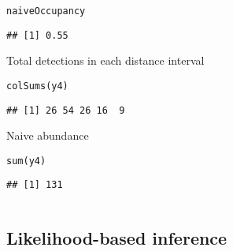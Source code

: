 \documentclass[color=usenames,dvipsnames]{beamer}\usepackage[]{graphicx}\usepackage[]{color}
\makeatletter
\newcommand{\hlstd}[1]{\textcolor[rgb]{0,0,0}{#1}}%
\newcommand{\hlkwd}[1]{\textcolor[rgb]{0.004,0.004,0.506}{#1}}%
\newenvironment{kframe}{%
 \def\at@end@of@kframe{}%
 \ifinner\ifhmode%
  \def\at@end@of@kframe{\end{minipage}}%
  \begin{minipage}{\columnwidth}%
 \fi\fi%
 \def\FrameCommand##1{\hskip\@totalleftmargin \hskip-\fboxsep
 \colorbox{shadecolor}{##1}\hskip-\fboxsep
     \hskip-\linewidth \hskip-\@totalleftmargin \hskip\columnwidth}%
 \MakeFramed {\advance\hsize-\width
   \@totalleftmargin\z@ \linewidth\hsize
   \@setminipage}}%
 {\par\unskip\endMakeFramed%
 \at@end@of@kframe}
\newenvironment{knitrout}{}{} %
\makeatother
\begin{document}
\begin{frame}[fragile]
\begin{columns}
\begin{column}{0.6\textwidth}
\begin{knitrout}
\begin{kframe}
\begin{alltt}
\hlstd{naiveOccupancy}
\end{alltt}
\begin{verbatim}
## [1] 0.55
\end{verbatim}
\end{kframe}
\end{knitrout}
  \pause
  \vfill
  \small
  Total detections in each distance interval
  \vspace{-6pt}
\begin{knitrout}\scriptsize
{}\color{fgcolor}\begin{kframe}
\begin{alltt}
\hlkwd{colSums}\hlstd{(y4)}
\end{alltt}
\begin{verbatim}
## [1] 26 54 26 16  9
\end{verbatim}
\end{kframe}
\end{knitrout}
  \pause
  \vfill
  Naive abundance
  \vspace{-6pt}
\begin{knitrout}\scriptsize
{}\color{fgcolor}\begin{kframe}
\begin{alltt}
\hlkwd{sum}\hlstd{(y4)}
\end{alltt}
\begin{verbatim}
## [1] 131
\end{verbatim}
\end{kframe}
\end{knitrout}
  \end{column}
  \end{columns}
\end{frame}






\subsection{Likelihood-based inference}
\end{document}
